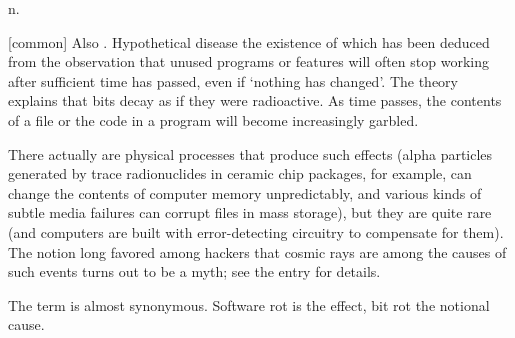  n.

[common] Also . Hypothetical disease the existence of which
has been deduced from the observation that unused programs or features will
often stop working after sufficient time has passed, even if `nothing has
changed'. The theory explains that bits decay as if they were radioactive. As
time passes, the contents of a file or the code in a program will become
increasingly garbled.

There actually are physical processes that produce such effects (alpha particles
generated by trace radionuclides in ceramic chip packages, for example, can
change the contents of computer memory  unpredictably, and various kinds of subtle media failures can corrupt
files in mass storage), but they are quite rare (and computers are built with
error-detecting circuitry to compensate for them). The notion long favored among
hackers that cosmic rays are among the causes of such events turns out to be a
myth; see the  entry for details.

The term  is almost synonymous. Software rot is the
effect, bit rot the notional cause.


